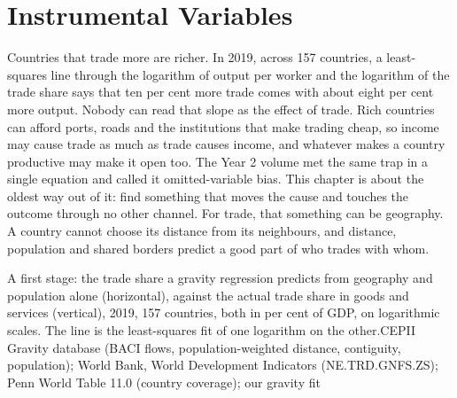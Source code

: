 \chapter{Instrumental Variables}\label{ch:b3:instrumental-variables}

Countries that trade more are richer. In 2019, across 157 countries, a
least-squares line through the logarithm of output per worker and the
logarithm of the trade share says that ten per cent more trade comes with
about eight per cent more output. %
Nobody can read that slope as the effect of trade. Rich countries can afford
ports, roads and the institutions that make trading cheap, so income may
cause trade as much as trade causes income, and whatever makes a country
productive may make it open too. The Year 2 volume met the same trap in a
single equation and called it omitted-variable bias. This chapter is about
the oldest way out of it: find something that moves the cause and touches the
outcome through no other channel. For trade, that something can be geography.
A country cannot choose its distance from its neighbours, and distance,
population and shared borders predict a good part of who trades with whom.

\begin{openingchart}{A first stage: the trade share a gravity regression
predicts from geography and population alone (horizontal), against the
actual trade share in goods and services (vertical), 2019, 157 countries,
both in per cent of GDP, on logarithmic scales. The line is the least-squares
fit of one logarithm on the other.}{CEPII Gravity database (BACI flows,
population-weighted distance, contiguity, population); World Bank, World
Development Indicators (NE.TRD.GNFS.ZS); Penn World Table 11.0 (country
coverage); our gravity fit}
\end{openingchart}

